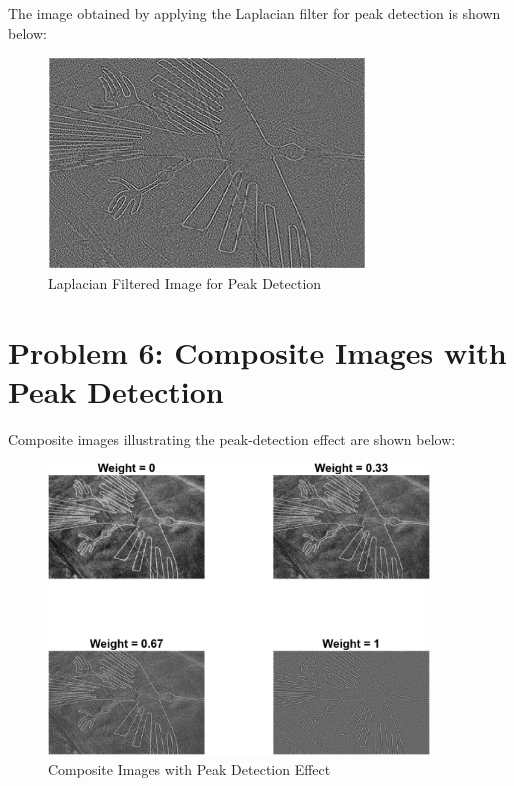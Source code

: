 \documentclass[12pt]{article}
\begin{document}
\vspace{1cm}
The image obtained by applying the Laplacian filter for peak detection is shown below:

\begin{figure}[H]
    \centering
    \includegraphics[width=0.75\textwidth]{laplacian_image.png}
    \caption{Laplacian Filtered Image for Peak Detection}
\end{figure}


\newpage
\section*{Problem 6: Composite Images with Peak Detection}
Composite images illustrating the peak-detection effect are shown below:

\begin{figure}[H]
    \centering
    \includegraphics[width=0.9\textwidth]{laplacian_composite_images.png}
    \caption{Composite Images with Peak Detection Effect}
\end{figure}
\end{document}
